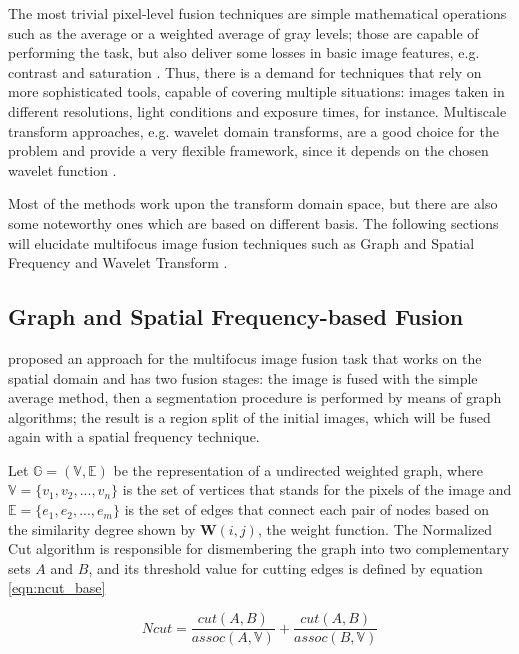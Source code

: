 The most trivial pixel-level fusion techniques are simple mathematical operations such as the average or a weighted average of gray levels; those are capable of performing the task, but also deliver some losses in basic image features, e.g. contrast and saturation \cite{zhang2009multifocus}. Thus, there is a demand for techniques that rely on more sophisticated tools, capable of covering multiple situations: images taken in different resolutions, light conditions and exposure times, for instance. Multiscale transform approaches, e.g. wavelet domain transforms, are a good choice for the problem and provide a very flexible framework, since it depends on the chosen wavelet function \cite{pajares2004wavelet}.

Most of the methods work upon the transform domain space, but there are also some noteworthy ones which are based on different basis. The following sections will elucidate multifocus image fusion techniques such as Graph and Spatial Frequency \cite{li2008multifocus} and Wavelet Transform \cite{pajares2004wavelet}.


\subsection{Graph and Spatial Frequency-based Fusion}

 proposed an approach for the multifocus image fusion task that works on the spatial domain and has two fusion stages: the image is fused with the simple average method, then a segmentation procedure is performed by means of graph algorithms; the result is a region split of the initial images, which will be fused again with a spatial frequency technique.

Let $\mathbb{G} = (\mathbb{V},\mathbb{E})$ be the representation of a undirected weighted graph, where $\mathbb{V} = \{v_{1},v_{2},...,v_{n}\}$ is the set of vertices that stands for the pixels of the image and $\mathbb{E} = \{e_{1},e_{2},...,e_{m}\}$ is the set of edges that connect each pair of nodes based on the similarity degree shown by $\mathbf{W}(i,j)$, the weight function. The Normalized Cut algorithm is responsible for dismembering the graph into two complementary sets $A$ and $B$, and its threshold value for cutting edges is defined by equation \ref{eqn:ncut_base}

\begin{equation}
\label{eqn:ncut_base}
    Ncut = 
    \frac{cut(A,B)}{assoc(A,\mathbb{V})} +
    \frac{cut(A,B)}{assoc(B,\mathbb{V})}
\end{equation}

